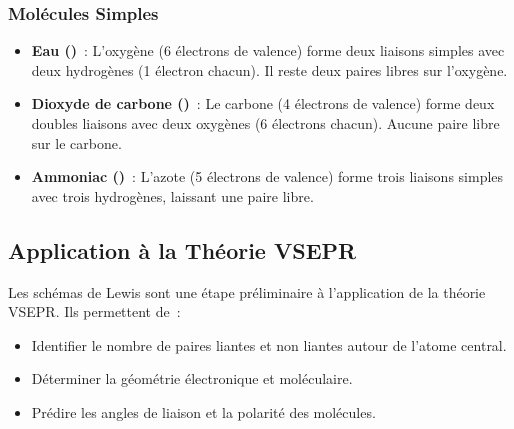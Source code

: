 \documentclass{article}
\begin{document}
\subsubsection{Molécules Simples}
\begin{itemize}
    \item \textbf{Eau ()}~:
    L'oxygène (6 électrons de valence) forme deux liaisons simples avec deux hydrogènes
    (1 électron chacun). Il reste deux paires libres sur l'oxygène.
    \begin{center}
    \end{center}

    \item \textbf{Dioxyde de carbone ()}~:
    Le carbone (4 électrons de valence) forme deux doubles liaisons avec deux oxygènes
    (6 électrons chacun). Aucune paire libre sur le carbone.
    \begin{center}
    \end{center}

    \item \textbf{Ammoniac ()}~:
    L'azote (5 électrons de valence) forme trois liaisons simples avec trois hydrogènes, 
    laissant une paire libre.
    \vspace{0.5cm}
   \begin{center}
    \end{center}
\end{itemize}

\subsection{Application à la Théorie VSEPR}
Les schémas de Lewis sont une étape préliminaire à l'application de la théorie VSEPR. Ils permettent de~:
\begin{itemize}
    \item Identifier le nombre de paires liantes et non liantes autour de l'atome central.
    \item Déterminer la géométrie électronique et moléculaire.
    \item Prédire les angles de liaison et la polarité des molécules.
\end{itemize}
\end{document}
